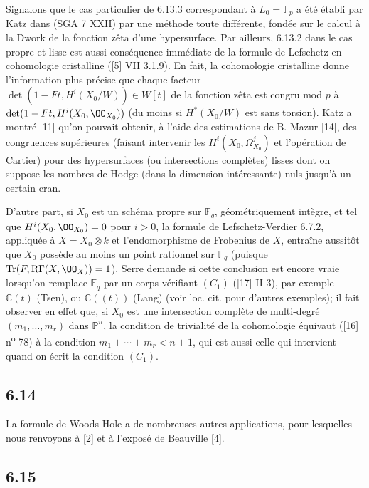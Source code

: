 Signalons que le cas particulier de 6.13.3 correspondant à $L_0=\mathbb{F}_p$ a été établi par Katz dans (SGA 7 XXII) par une méthode toute différente, fondée sur le calcul à la Dwork de la fonction zêta d'une hypersurface. Par ailleurs, 6.13.2 dans le cas propre et lisse est aussi conséquence immédiate de la formule de Lefschetz en cohomologie cristalline ([5] VII 3.1.9). En fait, la cohomologie cristalline donne l'information plus précise que chaque facteur $\det(1-Ft,H^i(X_0/W))\in W[t]$ de la fonction zêta est congru mod $p$ à $\det(1-Ft,H^i(X_0,\OO_{X_0}))$ (du moins si $H^*(X_0/W)$ est sans torsion). Katz a montré [11] qu'on pouvait obtenir, à l'aide des estimations de B. Mazur [14], des congruences supérieures (faisant intervenir les $H^i(X_0,\Omega^j_{X_0})$ et l'opération de Cartier) pour des hypersurfaces (ou intersections complètes) lisses dont on suppose les nombres de Hodge (dans la dimension intéressante) nuls jusqu'à un certain cran.

D'autre part, si $X_0$ est un schéma propre sur $\mathbb{F}_q$, géométriquement intègre, et tel que $H^i(X_0,\OO_{X_0})=0$ pour $i>0$, la formule de Lefschetz-Verdier 6.7.2, appliquée à $X=X_0\otimes k$ et l'endomorphisme de Frobenius de $X$, entraîne aussitôt que $X_0$ possède au moins un point rationnel sur $\mathbb{F}_q$ (puisque $\operatorname{Tr}(F,\mathrm{R}\Gamma(X,\OO_X))=1$). Serre demande si cette conclusion est encore vraie lorsqu'on remplace $\mathbb{F}_q$ par un corps vérifiant $(C_1)$ ([17] II 3), par exemple $\mathbb{C}(t)$ (Tsen), ou $\mathbb{C}((t))$ (Lang) (voir loc. cit. pour d'autres exemples); il fait observer en effet que, si $X_0$ est une intersection complète de multi-degré $(m_1,\ldots,m_r)$ dans $\mathbb{P}^n$, la condition de trivialité de la cohomologie équivaut ([16] n\textsuperscript{o} 78) à la condition $m_1+\cdots+m_r<n+1$, qui est aussi celle qui intervient quand on écrit la condition $(C_1)$.

\subsection*{6.14}
La
formule de Woods Hole a de nombreuses autres applications, pour lesquelles nous renvoyons à [2] et à l'exposé de Beauville [4].


\subsection*{6.15}

